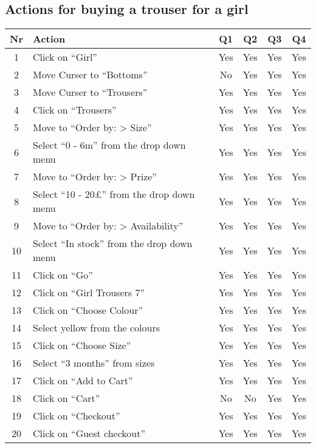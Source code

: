 \documentclass[fontsize=12pt,paper=a4]{scrartcl}
\begin{document}
\subsection{Actions for buying a trouser for a girl}
\begin{table}[htdp]
\begin{center}
\begin{tabular}{|c|l|c|c|c|c|}
\hline
\textbf{Nr} & \textbf{Action} & \textbf{Q1} & \textbf{Q2} & \textbf{Q3} &\textbf{Q4} \\
\hline
1 & Click on ``Girl''& Yes & Yes & Yes & Yes\\
\hline
2 & Move Curser to ``Bottoms'' & No & Yes & Yes & Yes \\
\hline
3 & Move Curser to ``Trousers'' & Yes & Yes & Yes & Yes \\
\hline
4 & Click on ``Trousers'' & Yes & Yes & Yes & Yes \\
\hline
5 & Move to ``Order by: > Size'' & Yes & Yes & Yes & Yes \\
\hline
6 & Select ``0 - 6m'' from the drop down menu & Yes & Yes & Yes & Yes\\
\hline
7 & Move to ``Order by: > Prize'' & Yes & Yes & Yes & Yes \\
\hline
8 & Select ``10 - 20\pounds'' from the drop down menu & Yes & Yes & Yes & Yes\\
\hline
9 & Move to ``Order by: > Availability'' & Yes & Yes & Yes & Yes \\
\hline
10 & Select ``In stock'' from the drop down menu & Yes & Yes & Yes & Yes\\
\hline
11 & Click on ``Go'' & Yes & Yes & Yes & Yes\\
\hline
12 & Click on ``Girl Trousers 7'' & Yes & Yes & Yes & Yes\\
\hline
13 & Click on ``Choose Colour'' & Yes & Yes & Yes & Yes\\
\hline
14 & Select yellow from the colours & Yes & Yes & Yes & Yes\\
\hline
15 & Click on ``Choose Size'' & Yes & Yes & Yes & Yes\\
\hline
16 & Select ``3 months'' from sizes & Yes & Yes & Yes & Yes\\
\hline
17 & Click on ``Add to Cart'' & Yes & Yes & Yes & Yes\\
\hline
18 & Click on ``Cart'' & No & No & Yes & Yes\\
\hline
19 & Click on ``Checkout'' & Yes & Yes & Yes & Yes\\
\hline
20 & Click on ``Guest checkout'' & Yes & Yes & Yes & Yes\\

\end{tabular}
\end{center}
\end{table}
\end{document}
